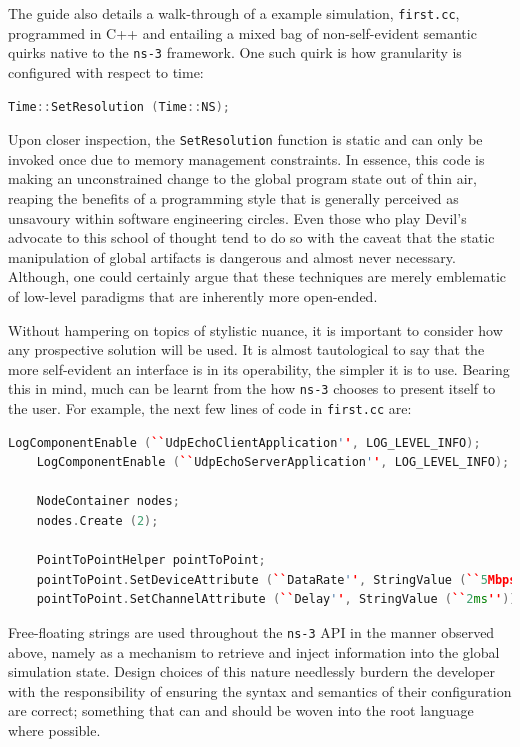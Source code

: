 The guide also details a walk-through of a example simulation, \texttt{first.cc}, programmed in C++ and entailing a
mixed bag of non-self-evident semantic quirks native to the \texttt{ns-3} framework. One such quirk is how
granularity is configured with respect to time:

\begin{lstlisting}[language=C++]
    Time::SetResolution (Time::NS);
\end{lstlisting}

Upon closer inspection, the \texttt{SetResolution} function is static and can only be invoked once due to memory
management constraints. In essence, this code is making an unconstrained change to the global program state out of thin
air, reaping the benefits of a programming style that is generally perceived as unsavoury within software engineering
circles\cite{stack_exchange_static_methods, git_connected_static_methods, medium_static_methods,
    tom_butler_static_methods}. Even those who play Devil's advocate to this school of thought tend to do so with the
caveat that the static manipulation of global artifacts is dangerous and almost never
necessary\cite{java_code_geeks_static_methods}. Although, one could certainly argue that these techniques are merely
emblematic of low-level paradigms that are inherently more open-ended.

Without hampering on topics of stylistic nuance, it is important to consider how any prospective solution will be
used. It is almost tautological to say that the more self-evident an interface is in its operability, the
simpler it is to use. Bearing this in mind, much can be learnt from the how \texttt{ns-3} chooses to present itself to
the user. For example, the next few lines of code in \texttt{first.cc} are:

\begin{lstlisting}[language=C++,firstnumber=2]
    LogComponentEnable (``UdpEchoClientApplication'', LOG_LEVEL_INFO);
    LogComponentEnable (``UdpEchoServerApplication'', LOG_LEVEL_INFO);

    NodeContainer nodes;
    nodes.Create (2);

    PointToPointHelper pointToPoint;
    pointToPoint.SetDeviceAttribute (``DataRate'', StringValue (``5Mbps''));
    pointToPoint.SetChannelAttribute (``Delay'', StringValue (``2ms''));
\end{lstlisting}

Free-floating strings are used throughout the \texttt{ns-3} API in the manner observed above, namely as a mechanism to
retrieve and inject information into the global simulation state. Design choices of this nature needlessly burdern the
developer with the responsibility of ensuring the syntax and semantics of their configuration are correct; something
that can and should be woven into the root language where possible.

